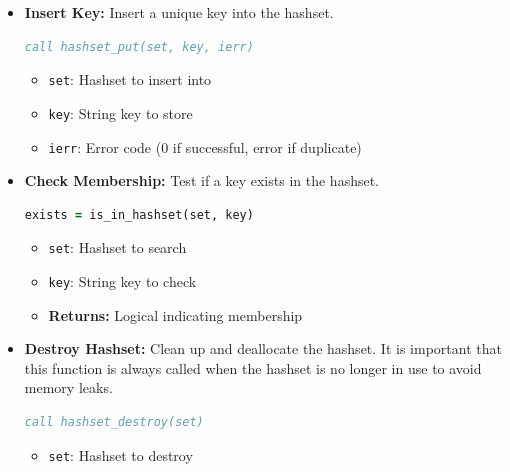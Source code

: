 \documentclass[11pt]{article}
\begin{document}
\begin{enumerate}
\begin{enumerate}
\begin{itemize}
	      	      	\item \textbf{Insert Key:} Insert a unique key into the hashset. 
	      	      	\begin{lstlisting}[language=Fortran]
call hashset_put(set, key, ierr)
	      	      	\end{lstlisting}
	      	      	\begin{itemize}
	      	      		\item \texttt{set}: Hashset to insert into
	      	      		      
	      	      		\item \texttt{key}: String key to store
	      	      		      
	      	      		\item \texttt{ierr}: Error code (0 if successful, error if duplicate)
	      	      	\end{itemize}
	      	      	
	      	      	\item \textbf{Check Membership:} Test if a key exists in the hashset.
	      	      	      \begin{lstlisting}[language=Fortran]
exists = is_in_hashset(set, key)
	      	      	      \end{lstlisting}
	      	      	      \begin{itemize}
	      	      	      	\item \texttt{set}: Hashset to search
	      	      	      	      
	      	      	      	\item \texttt{key}: String key to check
	      	      	      	      
	      	      	      	\item \textbf{Returns:} Logical indicating membership
	      	      	      \end{itemize}
	      	      	      
	      	      	\item \textbf{Destroy Hashset:} Clean up and deallocate the hashset.
	      	      	      It is important that this function is always called when the hashset
	      	      	      is no longer in use to avoid memory leaks.
	      	      	      \begin{lstlisting}[language=Fortran]
call hashset_destroy(set)
	      	      	      \end{lstlisting}
	      	      	      \begin{itemize}
	      	      	      	\item \texttt{set}: Hashset to destroy
	      	      	      \end{itemize}
	      	      \end{itemize}
	      	      

\end{enumerate}
\end{enumerate}
\end{document}
